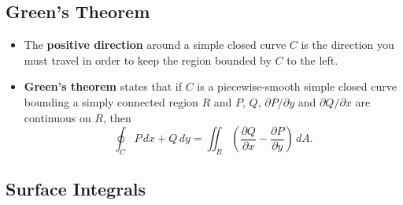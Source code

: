\documentclass{article}
\begin{document}
\subsection{Green’s Theorem}

\begin{itemize}
  \item The \textbf{positive direction} around a simple closed curve $C$ is the direction you must travel in order to keep the region bounded by $C$ to the left.

  \item \textbf{Green's theorem} states that if $C$ is a piecewise-smooth simple closed curve bounding a simply connected region $R$ and $P$, $Q$, $\partial P / \partial y$ and $\partial Q / \partial x$ are continuous on $R$, then \[\oint_C P \,dx + Q \,dy = \iint_R \left( \frac{\partial Q}{\partial x} - \frac{\partial P}{\partial y} \right) \,dA.\]
\end{itemize}

\subsection{Surface Integrals}
\end{document}
